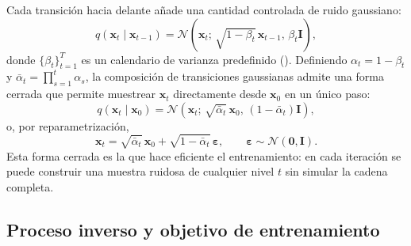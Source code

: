 Cada transición hacia delante añade una cantidad controlada de ruido
gaussiano:
\begin{equation}
    q(\mathbf{x}_t \mid \mathbf{x}_{t-1})
    = \mathcal{N}\!\left(\mathbf{x}_t;\, \sqrt{1 - \beta_t}\,
      \mathbf{x}_{t-1},\, \beta_t \mathbf{I}\right),
    \label{eq:forward-step}
\end{equation}
donde $\{\beta_t\}_{t=1}^{T}$ es un calendario de varianza
predefinido (). Definiendo
$\alpha_t = 1 - \beta_t$ y $\bar{\alpha}_t = \prod_{s=1}^{t}
\alpha_s$, la composición de transiciones gaussianas admite una forma
cerrada que permite muestrear $\mathbf{x}_t$ directamente desde
$\mathbf{x}_0$ en un único paso:
\begin{equation}
    q(\mathbf{x}_t \mid \mathbf{x}_0)
    = \mathcal{N}\!\left(\mathbf{x}_t;\, \sqrt{\bar{\alpha}_t}\,
      \mathbf{x}_0,\, (1 - \bar{\alpha}_t)\mathbf{I}\right),
    \label{eq:forward-closed}
\end{equation}
o, por reparametrización,
\begin{equation}
    \mathbf{x}_t
    = \sqrt{\bar{\alpha}_t}\,\mathbf{x}_0
    + \sqrt{1 - \bar{\alpha}_t}\,\boldsymbol{\varepsilon},
    \qquad
    \boldsymbol{\varepsilon} \sim \mathcal{N}(\mathbf{0}, \mathbf{I}).
    \label{eq:forward-reparam}
\end{equation}
Esta forma cerrada es la que hace eficiente el entrenamiento: en cada
iteración se puede construir una muestra ruidosa de cualquier nivel
$t$ sin simular la cadena completa.

\subsection{Proceso inverso y objetivo de entrenamiento}
\label{subsec:objetivo}

